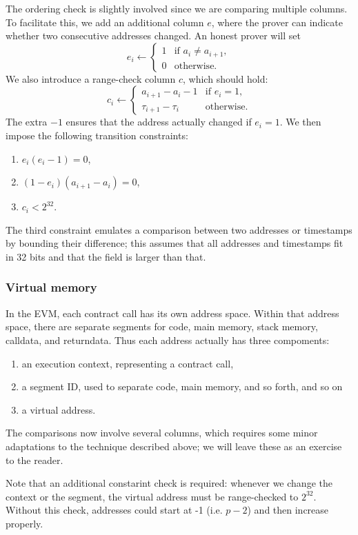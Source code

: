 The ordering check is slightly involved since we are comparing multiple columns. To facilitate this, we add an additional column $e$, where the prover can indicate whether two consecutive addresses changed. An honest prover will set
$$
e_i \leftarrow \begin{cases}
  1 & \text{if } a_i \neq a_{i + 1}, \\
  0 & \text{otherwise}.
\end{cases}
$$
We also introduce a range-check column $c$, which should hold:
$$
c_i \leftarrow \begin{cases}
  a_{i + 1} - a_i - 1 & \text{if } e_i = 1, \\
  \tau_{i+1} - \tau_i & \text{otherwise}.
\end{cases}
$$
The extra $-1$ ensures that the address actually changed if $e_i = 1$.
We then impose the following transition constraints:
\begin{enumerate}
  \item $e_i (e_i - 1) = 0$,
  \item $(1 - e_i) (a_{i + 1} - a_i) = 0$,
  \item $c_i < 2^{32}$.
\end{enumerate}
The third constraint emulates a comparison between two addresses or timestamps by bounding their difference; this assumes that all addresses and timestamps fit in 32 bits and that the field is larger than that.

\subsubsection{Virtual memory}

In the EVM, each contract call has its own address space. Within that address space, there are separate segments for code, main memory, stack memory, calldata, and returndata. Thus each address actually has three compoments:
\begin{enumerate}
  \item an execution context, representing a contract call,
  \item a segment ID, used to separate code, main memory, and so forth, and so on
  \item a virtual address.
\end{enumerate}
The comparisons now involve several columns, which requires some minor adaptations to the technique described above; we will leave these as an exercise to the reader.

Note that an additional constarint check is required: whenever we change the context or the segment, the virtual address must be range-checked to $2^{32}$.
Without this check, addresses could start at -1 (i.e. $p - 2$) and then increase properly.

